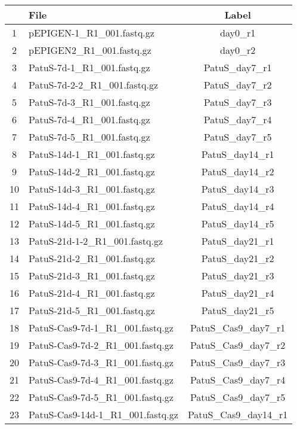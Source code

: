 \documentclass{article}
\begin{document}
\begin{table}[ht]
\centering
\begin{tabular}{cp{9cm}c}
  \hline
 & File & Label \\ 
  \hline
1 & pEPIGEN-1\_R1\_001.fastq.gz & day0\_r1 \\ 
  2 & pEPIGEN2\_R1\_001.fastq.gz & day0\_r2 \\ 
  3 & PatuS-7d-1\_R1\_001.fastq.gz & PatuS\_day7\_r1 \\ 
  4 & PatuS-7d-2-2\_R1\_001.fastq.gz & PatuS\_day7\_r2 \\ 
  5 & PatuS-7d-3\_R1\_001.fastq.gz & PatuS\_day7\_r3 \\ 
  6 & PatuS-7d-4\_R1\_001.fastq.gz & PatuS\_day7\_r4 \\ 
  7 & PatuS-7d-5\_R1\_001.fastq.gz & PatuS\_day7\_r5 \\ 
  8 & PatuS-14d-1\_R1\_001.fastq.gz & PatuS\_day14\_r1 \\ 
  9 & PatuS-14d-2\_R1\_001.fastq.gz & PatuS\_day14\_r2 \\ 
  10 & PatuS-14d-3\_R1\_001.fastq.gz & PatuS\_day14\_r3 \\ 
  11 & PatuS-14d-4\_R1\_001.fastq.gz & PatuS\_day14\_r4 \\ 
  12 & PatuS-14d-5\_R1\_001.fastq.gz & PatuS\_day14\_r5 \\ 
  13 & PatuS-21d-1-2\_R1\_001.fastq.gz & PatuS\_day21\_r1 \\ 
  14 & PatuS-21d-2\_R1\_001.fastq.gz & PatuS\_day21\_r2 \\ 
  15 & PatuS-21d-3\_R1\_001.fastq.gz & PatuS\_day21\_r3 \\ 
  16 & PatuS-21d-4\_R1\_001.fastq.gz & PatuS\_day21\_r4 \\ 
  17 & PatuS-21d-5\_R1\_001.fastq.gz & PatuS\_day21\_r5 \\ 
  18 & PatuS-Cas9-7d-1\_R1\_001.fastq.gz & PatuS\_Cas9\_day7\_r1 \\ 
  19 & PatuS-Cas9-7d-2\_R1\_001.fastq.gz & PatuS\_Cas9\_day7\_r2 \\ 
  20 & PatuS-Cas9-7d-3\_R1\_001.fastq.gz & PatuS\_Cas9\_day7\_r3 \\ 
  21 & PatuS-Cas9-7d-4\_R1\_001.fastq.gz & PatuS\_Cas9\_day7\_r4 \\ 
  22 & PatuS-Cas9-7d-5\_R1\_001.fastq.gz & PatuS\_Cas9\_day7\_r5 \\ 
  23 & PatuS-Cas9-14d-1\_R1\_001.fastq.gz & PatuS\_Cas9\_day14\_r1 \\ 

\end{tabular}
\end{table}
\end{document}
